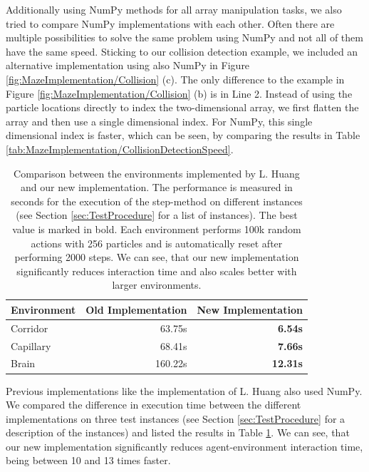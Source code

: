 Additionally using NumPy methods for all array manipulation tasks, we also tried to compare NumPy implementations with each other. Often there are multiple possibilities to solve the same problem using NumPy and not all of them have the same speed. Sticking to our collision detection example, we included an alternative implementation using also NumPy in Figure \ref{fig:MazeImplementation/Collision} (c). The only difference to the example in Figure \ref{fig:MazeImplementation/Collision} (b) is in Line 2. Instead of using the particle locations directly to index the two-dimensional array, we first flatten the array and then use a single dimensional index. For NumPy, this single dimensional index is faster, which can be seen, by comparing the results in Table \ref{tab:MazeImplementation/CollisionDetectionSpeed}.

\begin{table}[htp]
    \begin{center}
        \begin{tabular}{lrr}
            \toprule
            \multicolumn{1}{c}{Environment} & \multicolumn{1}{c}{Old Implementation} & \multicolumn{1}{c}{New Implementation} \\
            \midrule
            Corridor & 63.75s & \textbf{6.54s} \\
            Capillary & 68.41s & \textbf{7.66s} \\
            Brain & 160.22s & \textbf{12.31s} \\ 
            \bottomrule
        \end{tabular}
    \end{center}
    \caption[Maze Environment Implementation Speed Comparison]{Comparison between the environments implemented by L. Huang \cite{huangMazeGithub} and our new implementation. The performance is measured in seconds for the execution of the step-method on different instances (see Section \ref{sec:TestProcedure} for a list of instances). The best value is marked in bold. Each environment performs 100k random actions with 256 particles and is automatically reset after performing 2000 steps. We can see, that our new implementation significantly reduces interaction time and also scales better with larger environments.} \label{tab:MazeImplementation/ImplementationComparison}
\end{table}

Previous implementations like the implementation of L. Huang \cite{huangMazeGithub} also used NumPy. We compared the difference in execution time between the different implementations on three test instances (see Section \ref{sec:TestProcedure} for a description of the instances) and listed the results in Table \ref{tab:MazeImplementation/ImplementationComparison}. We can see, that our new implementation significantly reduces agent-environment interaction time, being between 10 and 13 times faster.

